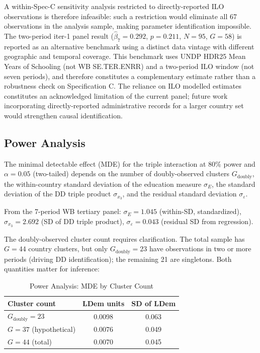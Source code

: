 \documentclass[11pt,letterpaper]{article}
\begin{document}
A within-Spec-C sensitivity analysis restricted to directly-reported ILO observations is therefore
infeasible: such a restriction would eliminate all 67 observations in the analysis sample, making
parameter identification impossible. The two-period iter-1 panel result ($\hat{\beta}_7 = 0.292$,
$p = 0.211$, $N = 95$, $G = 58$) is reported as an alternative benchmark using a distinct data
vintage with different geographic and temporal coverage. This benchmark uses UNDP HDR25 Mean Years
of Schooling (not WB SE.TER.ENRR) and a two-period ILO window (not seven periods), and therefore
constitutes a complementary estimate rather than a robustness check on Specification C. The
reliance on ILO modelled estimates constitutes an acknowledged limitation of the current panel;
future work incorporating directly-reported administrative records for a larger country set would
strengthen causal identification.

\subsection{Power Analysis}
\label{subsec:power}

The minimal detectable effect (MDE) for the triple interaction at 80\% power and $\alpha = 0.05$
(two-tailed) depends on the number of doubly-observed clusters $G_\text{doubly}$, the within-country
standard deviation of the education measure $\sigma_E$, the standard deviation of the DD triple
product $\sigma_{x_3}$, and the residual standard deviation $\sigma_\varepsilon$.

From the 7-period WB tertiary panel: $\sigma_E = 1.045$ (within-SD, standardized), $\sigma_{x_3}
= 2.692$ (SD of DD triple product), $\sigma_\varepsilon = 0.043$ (residual SD from regression).

The doubly-observed cluster count requires clarification. The total sample has $G = 44$ country
clusters, but only $G_\text{doubly} = 23$ have observations in two or more periods (driving DD
identification); the remaining 21 are singletons. Both quantities matter for inference:

\begin{table}[!htbp]
  \centering
  \caption{Power Analysis: MDE by Cluster Count}
  \label{tab:power}
  \begin{tabular}{lcc}
    \toprule
    Cluster count & LDem units & SD of LDem \\
    \midrule
    $G_\text{doubly} = 23$ & 0.0098 & 0.063 \\
    $G = 37$ (hypothetical) & 0.0076 & 0.049 \\
    $G = 44$ (total) & 0.0070 & 0.045 \\
    \bottomrule
  \end{tabular}
\end{table}
\end{document}
